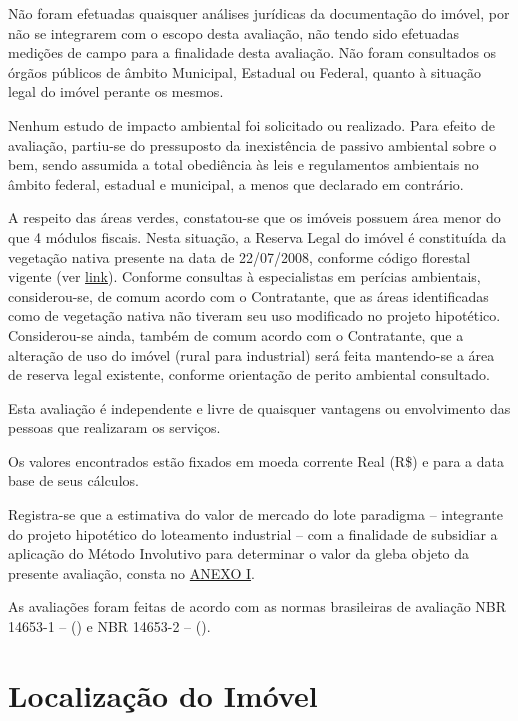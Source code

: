 \documentclass[
  10pt,
  a4paper]{article}
\begin{document}
Não foram efetuadas quaisquer análises jurídicas da documentação do
imóvel, por não se integrarem com o escopo desta avaliação, não tendo
sido efetuadas medições de campo para a finalidade desta avaliação. Não
foram consultados os órgãos públicos de âmbito Municipal, Estadual ou
Federal, quanto à situação legal do imóvel perante os mesmos.

Nenhum estudo de impacto ambiental foi solicitado ou realizado. Para
efeito de avaliação, partiu-se do pressuposto da inexistência de passivo
ambiental sobre o bem, sendo assumida a total obediência às leis e
regulamentos ambientais no âmbito federal, estadual e municipal, a menos
que declarado em contrário.

A respeito das áreas verdes, constatou-se que os imóveis possuem área
menor do que 4 módulos fiscais. Nesta situação, a Reserva Legal do
imóvel é constituída da vegetação nativa presente na data de 22/07/2008,
conforme código florestal vigente (ver
\href{https://www.embrapa.br/codigo-florestal/area-de-reserva-legal-arl}{link}).
Conforme consultas à especialistas em perícias ambientais,
considerou-se, de comum acordo com o Contratante, que as áreas
identificadas como de vegetação nativa não tiveram seu uso modificado no
projeto hipotético. Considerou-se ainda, também de comum acordo com o
Contratante, que a alteração de uso do imóvel (rural para industrial)
será feita mantendo-se a área de reserva legal existente, conforme
orientação de perito ambiental consultado.

Esta avaliação é independente e livre de quaisquer vantagens ou
envolvimento das pessoas que realizaram os serviços.

Os valores encontrados estão fixados em moeda corrente Real (R\$) e para
a data base de seus cálculos.

Registra-se que a estimativa do valor de mercado do lote paradigma --
integrante do projeto hipotético do loteamento industrial -- com a
finalidade de subsidiar a aplicação do Método Involutivo para determinar
o valor da gleba objeto da presente avaliação, consta no
\hyperref[anexo-i]{ANEXO I}.

As avaliações foram feitas de acordo com as normas brasileiras de
avaliação NBR 14653-1 --
() e NBR 14653-2 --
().

\section{Localização do Imóvel}\label{localizauxe7uxe3o-do-imuxf3vel}
\end{document}
